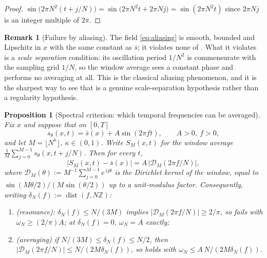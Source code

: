 \documentclass[a4paper,fleqn]{cas-dc}
\newtheorem{proposition}[theorem]{Proposition}
\theoremstyle{definition}
\newtheorem{remark}[theorem]{Remark}
\begin{document}
\begin{proof}
$\sin\bigl(2\pi N^{2}(t+j/N)\bigr)=\sin\bigl(2\pi N^{2}t+2\pi Nj\bigr)
=\sin(2\pi N^{2}t)$ since $2\pi Nj$ is an integer multiple of $2\pi$.
\end{proof}

\begin{remark}[Failure by aliasing]
\label{rem:aliasing}
The field \eqref{eq:aliasing} is smooth, bounded and Lipschitz in $x$ with the
same constant as $\bar s$; it violates none of .
What it violates is a \emph{scale separation} condition: its oscillation period
$1/N^{2}$ is commensurate with the sampling grid $1/N$, so the window average
sees a constant phase and performs no averaging at all. This is the classical
aliasing phenomenon, and it is the sharpest way to see that
 is a genuine scale-separation hypothesis rather than a
regularity hypothesis.
\end{remark}


\begin{proposition}[Spectral criterion: which temporal frequencies can be averaged]
\label{prop:spectral}
Fix $x$ and suppose that on $[0,T]$
\begin{equation}
s_{\theta}(x,t)=\bar s(x)+A\sin(2\pi f t),\qquad A>0,\ f>0,
\label{eq:tone}
\end{equation}
and let $M=\lfloor N^{\kappa}\rfloor$, $\kappa\in(0,1)$. Write $S_{M}(x,t)$ for the
window average $\frac{1}{M}\sum_{j=0}^{M-1}s_{\theta}(x,t+j/N)$. Then for every $t$,
\begin{equation}
\bigl|S_{M}(x,t)-\bar s(x)\bigr|=A\,\bigl|\mathcal{D}_{M}(2\pi f/N)\bigr|,
\label{eq:tone-residual}
\end{equation}
where $\mathcal{D}_{M}(\theta):=M^{-1}\sum_{j=0}^{M-1}e^{\,ij\theta}$ is the Dirichlet
kernel of the window, equal to $\sin(M\theta/2)/(M\sin(\theta/2))$ up to a unit-modulus
factor. Consequently, writing
$\delta_{N}(f):=\operatorname{dist}(f,N\mathbb{Z})$:
\begin{enumerate}\sloppy
\item[\textup{(i)}] \emph{(resonance):} $\delta_{N}(f)\le N/(3M)$ implies
$\lvert\mathcal{D}_{M}(2\pi f/N)\rvert\ge2/\pi$, so  \emph{fails} with
$\omega_{N}\ge(2/\pi)A$; at $\delta_{N}(f)=0$, $\omega_{N}=A$ exactly;
\item[\textup{(ii)}] \emph{(averaging)} if $N/(3M)\le\delta_{N}(f)\le N/2$, then
$\lvert\mathcal{D}_{M}(2\pi f/N)\rvert\le N/(2M\delta_{N}(f))$, so  holds
with $\omega_{N}\le A\,N/(2M\delta_{N}(f))$.
\end{enumerate}
\end{proposition}
\end{document}

